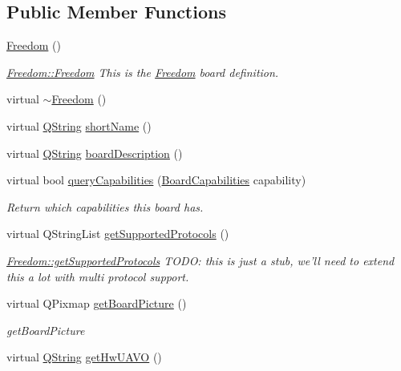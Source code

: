 \subsection*{Public Member Functions}
\begin{DoxyCompactItemize}
\item 
\hyperlink{group___boards___tau_labs_plugin_ga87f0c726ad13819e3918a3e270021fe9}{Freedom} ()
\begin{DoxyCompactList}\small\item\em \hyperlink{group___boards___tau_labs_plugin_ga87f0c726ad13819e3918a3e270021fe9}{Freedom\-::\-Freedom} This is the \hyperlink{class_freedom}{Freedom} board definition. \end{DoxyCompactList}\item 
virtual \hyperlink{group___boards___tau_labs_plugin_ga877df717ce1cf3c223d88f54ba538092}{$\sim$\-Freedom} ()
\item 
virtual \hyperlink{group___u_a_v_objects_plugin_gab9d252f49c333c94a72f97ce3105a32d}{Q\-String} \hyperlink{group___boards___tau_labs_plugin_ga430b08f4808aa122ae6f93fc1afd1ef5}{short\-Name} ()
\item 
virtual \hyperlink{group___u_a_v_objects_plugin_gab9d252f49c333c94a72f97ce3105a32d}{Q\-String} \hyperlink{group___boards___tau_labs_plugin_ga7668e232716f9de134cbcbb2936fda15}{board\-Description} ()
\item 
virtual bool \hyperlink{group___boards___tau_labs_plugin_ga9fe63b3e3b843bb34144942f4faafa3f}{query\-Capabilities} (\hyperlink{group___core_plugin_ga01b09218f2a13aaeee6db007ac6bd967}{Board\-Capabilities} capability)
\begin{DoxyCompactList}\small\item\em Return which capabilities this board has. \end{DoxyCompactList}\item 
virtual Q\-String\-List \hyperlink{group___boards___tau_labs_plugin_ga0666d1e73c1b7042303e2804c849420d}{get\-Supported\-Protocols} ()
\begin{DoxyCompactList}\small\item\em \hyperlink{group___boards___tau_labs_plugin_ga0666d1e73c1b7042303e2804c849420d}{Freedom\-::get\-Supported\-Protocols} T\-O\-D\-O\-: this is just a stub, we'll need to extend this a lot with multi protocol support. \end{DoxyCompactList}\item 
virtual Q\-Pixmap \hyperlink{group___boards___tau_labs_plugin_ga07d3982d49c35a87baa85e32af63e49c}{get\-Board\-Picture} ()
\begin{DoxyCompactList}\small\item\em get\-Board\-Picture \end{DoxyCompactList}\item 
virtual \hyperlink{group___u_a_v_objects_plugin_gab9d252f49c333c94a72f97ce3105a32d}{Q\-String} \hyperlink{group___boards___tau_labs_plugin_ga09397e9d9712878ddda4020b236f9ed5}{get\-Hw\-U\-A\-V\-O} ()
\end{DoxyCompactItemize}
